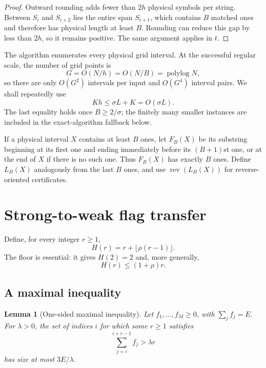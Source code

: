 \documentclass[11pt]{article}
\newtheorem{lemma}[lemma]{Lemma}
\theoremstyle{remark}
\newcommand{\rev}{\operatorname{rev}}
\newcommand{\polylog}{\operatorname{polylog}}
\begin{document}
\begin{proof}
Outward rounding adds fewer than $2h$ physical symbols per string.  Between
$S_i$ and $S_{i+2}$ lies the entire span $S_{i+1}$, which contains $B$
matched ones and therefore has physical length at least $B$.  Rounding can
reduce this gap by less than $2h$, so it remains positive.  The same argument
applies in $t$.
\end{proof}

The algorithm enumerates every physical grid interval.  At the successful
regular scale, the number of grid points is
\begin{equation}\label{eq:grid-count}
 G=O(N/h)=O(N/B)=\polylog N,
\end{equation}
so there are only $O(G^2)$ intervals per input and $O(G^4)$ interval pairs.
We shall repeatedly use
\begin{equation}\label{eq:Kh}
 Kh\le \sigma L+K=O(\sigma L).
\end{equation}
The last equality holds once $B\ge 2/\sigma$; the finitely many smaller
instances are included in the exact-algorithm fallback below.

If a physical interval $X$ contains at least $B$ ones, let $F_B(X)$ be its
substring beginning at its first one and ending immediately before its
$(B+1)$st one, or at the end of $X$ if there is no such one.  Thus $F_B(X)$
has exactly $B$ ones.  Define $L_B(X)$ analogously from the last $B$ ones,
and use $\rev(L_B(X))$ for reverse-oriented certificates.

\section{Strong-to-weak flag transfer}
\label{sec:flag-transfer}

Define, for every integer $r\ge1$,
\begin{equation}\label{eq:H}
 H(r)=r+\lfloor\rho(r-1)\rfloor.
\end{equation}
The floor is essential: it gives $H(2)=2$ and, more generally,
\begin{equation}\label{eq:H-bound}
 H(r)\le(1+\rho)r.
\end{equation}

\subsection{A maximal inequality}

\begin{lemma}[One-sided maximal inequality]\label{lem:maximal}
Let $f_1,\dots,f_M\ge0$, with $\sum_jf_j=E$.  For $\lambda>0$, the set of
indices $i$ for which some $r\ge1$ satisfies
\[
 \sum_{j=i}^{i+r-1}f_j>\lambda r
\]
has size at most $3E/\lambda$.
\end{lemma}
\end{document}
